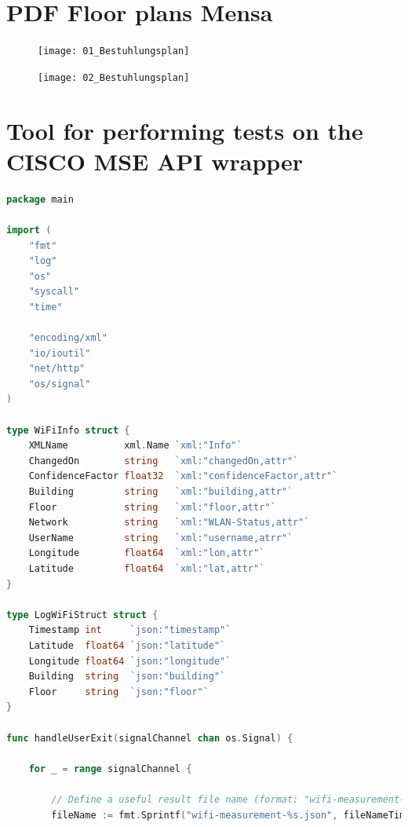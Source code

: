 \documentclass[twoside,11pt,titlepage,a4paper,english,bibliography=totocnumbered,listof=numbered]{scrbook}
\begin{document}
\begin{appendices}

\section{PDF Floor plans Mensa}

\begin{figure}[!htb]
\centering
  \texttt{[image: 01\_Bestuhlungsplan]}
\end{figure}

\begin{figure}[!htb]
\centering
  \texttt{[image: 02\_Bestuhlungsplan]}
\end{figure}

\section{Tool for performing tests on the CISCO MSE API wrapper}
\label{appendix:cisco-mse-api-test}

\begin{lstlisting}[language=go]
package main

import (
    "fmt"
    "log"
    "os"
    "syscall"
    "time"

    "encoding/xml"
    "io/ioutil"
    "net/http"
    "os/signal"
)

type WiFiInfo struct {
    XMLName          xml.Name `xml:"Info"`
    ChangedOn        string   `xml:"changedOn,attr"`
    ConfidenceFactor float32  `xml:"confidenceFactor,attr"`
    Building         string   `xml:"building,attr"`
    Floor            string   `xml:"floor,attr"`
    Network          string   `xml:"WLAN-Status,attr"`
    UserName         string   `xml:"username,atrr"`
    Longitude        float64  `xml:"lon,attr"`
    Latitude         float64  `xml:"lat,attr"`
}

type LogWiFiStruct struct {
    Timestamp int     `json:"timestamp"`
    Latitude  float64 `json:"latitude"`
    Longitude float64 `json:"longitude"`
    Building  string  `json:"building"`
    Floor     string  `json:"floor"`
}

func handleUserExit(signalChannel chan os.Signal) {

    for _ = range signalChannel {

        // Define a useful result file name (format: "wifi-measurement-year-month-day-hour-minute-seconds.json")
        fileName := fmt.Sprintf("wifi-measurement-%s.json", fileNameTime)


\end{lstlisting}
\end{appendices}
\end{document}
